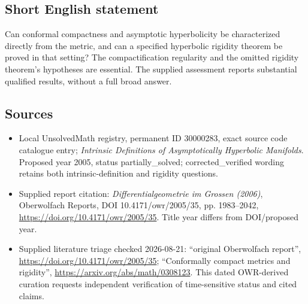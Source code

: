 \documentclass[11pt]{article}
\begin{document}
\subsection{Short English statement}
Can conformal compactness and asymptotic hyperbolicity be characterized directly from the metric, and can a specified hyperbolic rigidity theorem be proved in that setting? The compactification regularity and the omitted rigidity theorem's hypotheses are essential. The supplied assessment reports substantial qualified results, without a full broad answer.
\subsection{Sources}
\begin{itemize}
\item Local UnsolvedMath registry, permanent ID 30000283, exact source code catalogue entry; \emph{Intrinsic Definitions of Asymptotically Hyperbolic Manifolds}. Proposed year 2005, status partially\_solved; corrected\_verified wording retains both intrinsic-definition and rigidity questions.
\item Supplied report citation: \emph{Differentialgeometrie im Grossen (2006)}, Oberwolfach Reports, DOI 10.4171/owr/2005/35, pp. 1983--2042, \url{https://doi.org/10.4171/owr/2005/35}. Title year differs from DOI/proposed year.
\item Supplied literature triage checked 2026-08-21: ``original Oberwolfach report'', \url{https://doi.org/10.4171/owr/2005/35}; ``Conformally compact metrics and rigidity'', \url{https://arxiv.org/abs/math/0308123}. This dated OWR-derived curation requests independent verification of time-sensitive status and cited claims.
\end{itemize}
\end{document}

